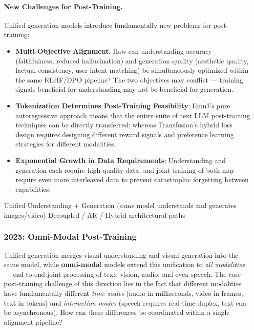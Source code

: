 \paragraph{New Challenges for Post-Training.}
Unified generation models introduce fundamentally new problems for post-training:
\begin{itemize}[leftmargin=2em]
  \item \textbf{Multi-Objective Alignment}:
    How can understanding accuracy (faithfulness, reduced hallucination)
    and generation quality (aesthetic quality, factual consistency, user intent matching)
    be simultaneously optimized within the same RLHF/DPO pipeline?
    The two objectives may conflict --- training signals beneficial for understanding may not be beneficial for generation.
  \item \textbf{Tokenization Determines Post-Training Feasibility}:
    Emu3's pure autoregressive approach means that the entire suite of text LLM post-training techniques
    can be directly transferred;
    whereas Transfusion's hybrid loss design requires designing different reward signals
    and preference learning strategies for different modalities.
  \item \textbf{Exponential Growth in Data Requirements}:
    Understanding and generation each require high-quality data,
    and joint training of both may require even more interleaved data
    to prevent catastrophic forgetting between capabilities.
\end{itemize}

  {Unified Understanding + Generation (same model understands and generates images/video)}
  {Decoupled / AR / Hybrid architectural paths}

\subsubsection{2025: Omni-Modal Post-Training}
\label{sec:t5-omni}

Unified generation merges visual understanding and visual generation into the same model,
while \textbf{omni-modal} models extend this unification to \textit{all modalities} ---
end-to-end joint processing of text, vision, audio, and even speech.
The core post-training challenge of this direction lies in the fact that
different modalities have fundamentally different \textit{time scales} (audio in milliseconds, video in frames, text in tokens)
and \textit{interaction modes} (speech requires real-time duplex, text can be asynchronous).
How can these differences be coordinated within a single alignment pipeline?

